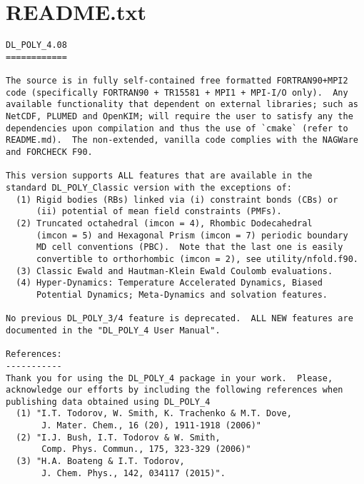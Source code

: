 \label{readme}
\section{README.txt}
\begin{verbatim}
DL_POLY_4.08
============

The source is in fully self-contained free formatted FORTRAN90+MPI2
code (specifically FORTRAN90 + TR15581 + MPI1 + MPI-I/O only).  Any
available functionality that dependent on external libraries; such as
NetCDF, PLUMED and OpenKIM; will require the user to satisfy any the
dependencies upon compilation and thus the use of `cmake` (refer to
README.md).  The non-extended, vanilla code complies with the NAGWare
and FORCHECK F90.

This version supports ALL features that are available in the
standard DL_POLY_Classic version with the exceptions of:
  (1) Rigid bodies (RBs) linked via (i) constraint bonds (CBs) or
      (ii) potential of mean field constraints (PMFs).
  (2) Truncated octahedral (imcon = 4), Rhombic Dodecahedral
      (imcon = 5) and Hexagonal Prism (imcon = 7) periodic boundary
      MD cell conventions (PBC).  Note that the last one is easily
      convertible to orthorhombic (imcon = 2), see utility/nfold.f90.
  (3) Classic Ewald and Hautman-Klein Ewald Coulomb evaluations.
  (4) Hyper-Dynamics: Temperature Accelerated Dynamics, Biased
      Potential Dynamics; Meta-Dynamics and solvation features.

No previous DL_POLY_3/4 feature is deprecated.  ALL NEW features are
documented in the "DL_POLY_4 User Manual".

References:
-----------
Thank you for using the DL_POLY_4 package in your work.  Please,
acknowledge our efforts by including the following references when
publishing data obtained using DL_POLY_4
  (1) "I.T. Todorov, W. Smith, K. Trachenko & M.T. Dove,
       J. Mater. Chem., 16 (20), 1911-1918 (2006)"
  (2) "I.J. Bush, I.T. Todorov & W. Smith,
       Comp. Phys. Commun., 175, 323-329 (2006)"
  (3) "H.A. Boateng & I.T. Todorov,
       J. Chem. Phys., 142, 034117 (2015)".


\end{verbatim}
